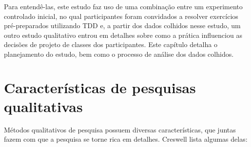 Para entendê-las, este estudo faz uso de uma combinação entre um experimento controlado inicial, no qual participantes foram
convidados a resolver exercícios pré-preparados utilizando TDD e, a partir dos dados colhidos nesse estudo, um outro
estudo qualitativo entrou em detalhes sobre como a prática influenciou as decisões de projeto de classes dos participantes.
Este capítulo detalha o planejamento do estudo, bem como o processo de análise dos dados colhidos.


\section{Características de pesquisas qualitativas}

Métodos qualitativos de pesquisa possuem diversas características, que juntas fazem
com que a pesquisa se torne rica em detalhes. Creswell \cite{creswell} lista
algumas delas:

